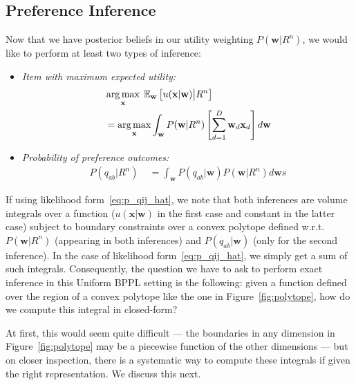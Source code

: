 \documentclass[letterpaper]{article}
\newcommand{\E}{\mathbb{E}}
\renewcommand{\vec}[1]{\mathbf{#1}}
\def\argmax{\operatornamewithlimits{arg\,max}}
\begin{document}
\subsection{Preference Inference}

\label{sec:bppl_inference}


Now that we have posterior beliefs in our utility weighting 
$P(\vec{w}|R^n)$, we would like to perform at least two types of inference:
\begin{itemize}
\item {\it Item with maximum expected utility:} 
\begin{align}
\label{eq:maxEU}
& \argmax_{\vec{x}} \; \E_{\vec{w}} \left[ u(\vec{x}|\vec{w}) \big| R^n \right]\\ & = \argmax_{\vec{x}} \int_{\vec{w}} P(\vec{w}|R^n) \left[ \sum_{d=1}^{D} \vec{w}_d \vec{x}_d \right] d\vec{w}
\end{align}
\item {\it Probability of preference outcomes:} 
\begin{align*}
P(q_{ab} | R^n) \; & = \int_\vec{w} P(q_{ab} | \vec{w}) P(\vec{w}|R^n) d\vec{w}s
\end{align*}
\end{itemize}
If using likelihood form~\eqref{eq:p_qij_hat}, we note that both
inferences are volume integrals over a function ($u(\vec{x}|\vec{w})$
in the first case and constant in the latter case) subject to boundary
constraints over a convex polytope defined w.r.t.\ $P(\vec{w}|R^n)$
(appearing in both inferences) and $P(q_{ab} | \vec{w})$ (only for the
second inference).  In the case of likelihood
form~\eqref{eq:p_qij_hat}, we simply get a sum of such integrals.
Consequently, the question we have to ask to perform exact inference
in this Uniform BPPL setting is the following: given a function
defined over the region of a convex polytope like the one in
Figure~\ref{fig:polytope}, how do we compute this integral in
closed-form?

At first, this would seem quite difficult --- the boundaries in any
dimension in Figure~\ref{fig:polytope} may be a piecewise function of
the other dimensions --- but on closer inspection, there is a
systematic way to compute these integrals if given the right
representation.  We discuss this next.
\end{document}
